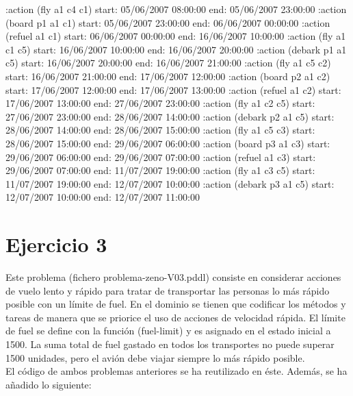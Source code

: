 \documentclass[	DIV=calc,%
							paper=a4,%
							fontsize=11pt]{scrartcl}	 					%
\newcommand{\miit}[1]{{\usefont{T1}{mdugm}{m}{it}\selectfont #1}}
\begin{document}
\begin{bashcode}
	:action (fly a1 c4 c1) start: 05/06/2007 08:00:00 end: 05/06/2007 23:00:00
	:action (board p1 a1 c1) start: 05/06/2007 23:00:00 end: 06/06/2007 00:00:00
	:action (refuel a1 c1) start: 06/06/2007 00:00:00 end: 16/06/2007 10:00:00
	:action (fly a1 c1 c5) start: 16/06/2007 10:00:00 end: 16/06/2007 20:00:00
	:action (debark p1 a1 c5) start: 16/06/2007 20:00:00 end: 16/06/2007 21:00:00
	:action (fly a1 c5 c2) start: 16/06/2007 21:00:00 end: 17/06/2007 12:00:00
	:action (board p2 a1 c2) start: 17/06/2007 12:00:00 end: 17/06/2007 13:00:00
	:action (refuel a1 c2) start: 17/06/2007 13:00:00 end: 27/06/2007 23:00:00
	:action (fly a1 c2 c5) start: 27/06/2007 23:00:00 end: 28/06/2007 14:00:00
	:action (debark p2 a1 c5) start: 28/06/2007 14:00:00 end: 28/06/2007 15:00:00
	:action (fly a1 c5 c3) start: 28/06/2007 15:00:00 end: 29/06/2007 06:00:00
	:action (board p3 a1 c3) start: 29/06/2007 06:00:00 end: 29/06/2007 07:00:00
	:action (refuel a1 c3) start: 29/06/2007 07:00:00 end: 11/07/2007 19:00:00
	:action (fly a1 c3 c5) start: 11/07/2007 19:00:00 end: 12/07/2007 10:00:00
	:action (debark p3 a1 c5) start: 12/07/2007 10:00:00 end: 12/07/2007 11:00:00
\end{bashcode}

\section{Ejercicio 3}
\label{sec:Ejercicio 3}

\miit{Este problema (fichero problema-zeno-V03.pddl) consiste en considerar acciones de vuelo lento y
rápido para tratar de transportar las personas lo más rápido posible con un límite de fuel. En el dominio
se tienen que codificar los métodos y tareas de manera que se priorice el uso de acciones de velocidad
rápida. El límite de fuel se define con la función (fuel-limit) y es asignado en el estado inicial a 1500. La
suma total de fuel gastado en todos los transportes no puede superar 1500 unidades, pero el avión debe
viajar siempre lo más rápido posible.}\\

El código de ambos problemas anteriores se ha reutilizado en éste. Además, se ha añadido lo siguiente:
\end{document}
